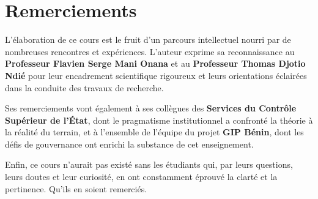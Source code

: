 \documentclass[12pt, a4paper, twoside, openright]{book}
\begin{document}
\clearpage
\thispagestyle{empty}
\chapter*{Remerciements}

L'élaboration de ce cours est le fruit d'un parcours intellectuel nourri par de nombreuses rencontres et expériences. L'auteur exprime sa reconnaissance au \textbf{Professeur Flavien Serge Mani Onana} et au \textbf{Professeur Thomas Djotio Ndié} pour leur encadrement scientifique rigoureux et leurs orientations éclairées dans la conduite des travaux de recherche.

Ses remerciements vont également à ses collègues des \textbf{Services du Contrôle Supérieur de l'État}, dont le pragmatisme institutionnel a confronté la théorie à la réalité du terrain, et à l'ensemble de l'équipe du projet \textbf{GIP Bénin}, dont les défis de gouvernance ont enrichi la substance de cet enseignement.

Enfin, ce cours n'aurait pas existé sans les étudiants qui, par leurs questions, leurs doutes et leur curiosité, en ont constamment éprouvé la clarté et la pertinence. Qu'ils en soient remerciés.

\clearpage
\tableofcontents

\clearpage
\listoffigures
{}

\listoftables
{}

\lstlistoflistings
{}
\end{document}
